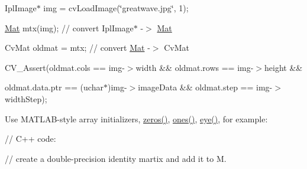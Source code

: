 {\ttfamily }

{\ttfamily }

{\ttfamily Ipl\+Image$\ast$ img = cv\+Load\+Image(\char`\"{}greatwave.\+jpg\char`\"{}, 1);}

{\ttfamily }

{\ttfamily }

{\ttfamily \mbox{\hyperlink{classorg_1_1opencv_1_1core_1_1_mat}{Mat}} mtx(img); // convert Ipl\+Image$\ast$ -\/$>$ \mbox{\hyperlink{classorg_1_1opencv_1_1core_1_1_mat}{Mat}}}

{\ttfamily }

{\ttfamily }

{\ttfamily Cv\+Mat oldmat = mtx; // convert \mbox{\hyperlink{classorg_1_1opencv_1_1core_1_1_mat}{Mat}} -\/$>$ Cv\+Mat}

{\ttfamily }

{\ttfamily }

{\ttfamily C\+V\+\_\+\+Assert(oldmat.\+cols == img-\/$>$width \&\& oldmat.\+rows == img-\/$>$height \&\&}

{\ttfamily }

{\ttfamily }

{\ttfamily oldmat.\+data.\+ptr == (uchar$\ast$)img-\/$>$image\+Data \&\& oldmat.\+step == img-\/$>$width\+Step);}

{\ttfamily }

{\ttfamily }

{\ttfamily }


\begin{DoxyItemize}
\item Use M\+A\+T\+L\+A\+B-\/style array initializers, {\ttfamily \mbox{\hyperlink{classorg_1_1opencv_1_1core_1_1_mat_aff41070138369b96f792b19f01ab00d9}{zeros()}}, \mbox{\hyperlink{classorg_1_1opencv_1_1core_1_1_mat_a34d703df023730d043298601b6962f57}{ones()}}, \mbox{\hyperlink{classorg_1_1opencv_1_1core_1_1_mat_a4de6ffd10feb724153f1ec1231533aa9}{eye()}}}, for example\+: 
\end{DoxyItemize}

{\ttfamily }

{\ttfamily }

{\ttfamily }

{\ttfamily // C++ code\+:}

{\ttfamily }

{\ttfamily }

{\ttfamily // create a double-\/precision identity martix and add it to M.}

{\ttfamily }

{\ttfamily }

